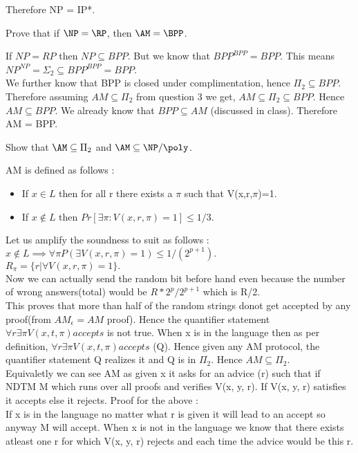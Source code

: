 \documentclass[12pt]{exam}
\begin{document}
\begin{questions}
\begin{solution}
Therefore NP = IP*.
\end{solution}
\question[10]
Prove that if $\NP = \RP$, then $\AM = \BPP$.
\begin{solution}
If $NP = RP$ then $NP \subseteq BPP$.
But we know that $BPP^{BPP} = BPP$. This means
$NP^{NP} = \Sigma_2 \subseteq BPP^{BPP} = BPP$.\\
We further know that BPP is closed under complimentation,
hence $\Pi_2 \subseteq BPP$. Therefore assuming
$AM \subseteq \Pi_2$ from question 3 we get,
$AM \subseteq \Pi_2 \subseteq BPP$. Hence $AM \subseteq BPP$.
We already know that $BPP \subseteq AM$ (discussed in class).
Therefore AM = BPP.
\end{solution}
\question[10]
Show that $\AM \subseteq \Pi_2$ and $\AM \subseteq \NP/\poly$.
\begin{solution}
AM is defined as follows :
\begin{itemize}
 \item If $x \in L$ then for all r there exists a $\pi$ such that V(x,r,$\pi$)=1.
 \item If $x \not \in L$ then $Pr[\exists \pi : V(x,r,\pi) = 1] \le 1/3$.
 \end{itemize}
Let us amplify the soundness to suit as follows :\\
$x \not \in L \implies \forall \pi P(\exists V(x, r, \pi) = 1) \le 1/(2^{p+1}).$\\
$R_\pi = \{r | \forall V(x, r, \pi) = 1\}.$\\
Now we can actually send the random bit before hand even because the
number of wrong answers(total) would be $R*2^p/2^{p+1}$ which is R/2.\\
This proves that more than half of the random strings donot get accepted
by any proof(from $AM_\epsilon = AM$ proof). Hence the quantifier
statement $\forall r \exists \pi V(x, t, \pi) accepts$ is not true.
When x is in the language then as per definition,
$\forall r \exists \pi V(x, t, \pi) accepts$ (Q). Hence given any AM protocol,
the quantifier statement Q realizes it and Q is in $\Pi_2$. Hence
$AM \subseteq \Pi_2$.\\

Equivaletly we can see AM as given x it asks for an advice
(r) such that if NDTM M which runs over all proofs and verifies
V(x, y, r). If V(x, y, r) satisfies it accepts else it rejects.
Proof for the above :\\
If x is in the language no matter what r is given it will
lead to an accept so anyway M will accept. When x is not
in the language we know that there exists atleast one r for which
V(x, y, r) rejects and each time the advice would be this r.\\



\end{solution}
\end{questions}
\end{document}
